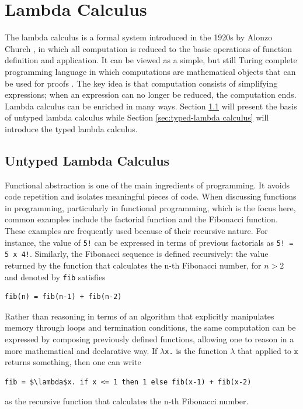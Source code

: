 \chapter{Lambda Calculus}\label{chapter:lambda-calculus}
\lhead[\fancyplain{}{\bfseries\thepage}]{\fancyplain{}{\bfseries\rightmark}}

The lambda calculus is a formal system introduced in the 1920s by Alonzo Church \cite{the-calculi-of-lambda-conversion}, in which all computation is reduced to the basic operations of function definition and application. It can be viewed as a simple, but still Turing complete programming language in which computations are mathematical objects that can be used for proofs \cite{types-and-programming-languages}. The key idea is that computation consists of simplifying expressions; when an expression can no longer be reduced, the computation ends. Lambda calculus can be enriched in many ways. Section \ref{sec:untyped-lambda calculus} will present the basis of untyped lambda calculus while Section \ref{sec:typed-lambda calculus} will introduce the typed lambda calculus.

\section{Untyped Lambda Calculus}\label{sec:untyped-lambda calculus}
Functional abstraction is one of the main ingredients of programming. It avoids code repetition and isolates meaningful pieces of code. When discussing functions in programming, particularly in functional programming, which is the focus here, common examples include the factorial function and the Fibonacci function. These examples are frequently used because of their recursive nature. For instance, the value of \verb|5!| can be expressed in terms of previous factorials as \verb|5! = 5 x 4!|. Similarly, the Fibonacci sequence is defined recursively: the value returned by the function that calculates the n-th Fibonacci number, for $n>2$ and denoted by \verb|fib| satisfies
\begin{lstlisting}
fib(n) = fib(n-1) + fib(n-2)
\end{lstlisting}
Rather than reasoning in terms of an algorithm that explicitly manipulates memory through loops and termination conditions, the same computation can be expressed by composing previously defined functions, allowing one to reason in a more mathematical and declarative way. If \texttt{$\lambda$x.} is the function $\lambda$ that applied to $\mathtt{x}$ returns something, then one can write
\begin{lstlisting}[breaklines]
fib = $\lambda$x. if x <= 1 then 1 else fib(x-1) + fib(x-2)
\end{lstlisting}
as the recursive function that calculates the n-th Fibonacci number.

